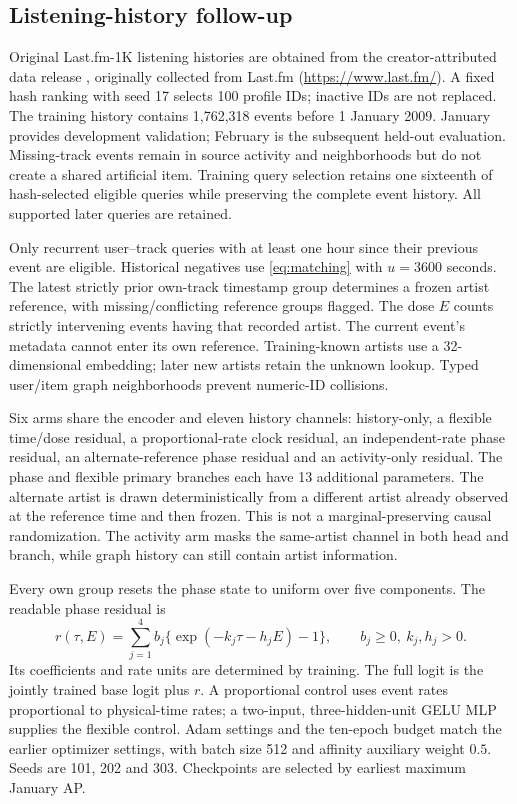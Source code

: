 \documentclass[pdflatex,sn-vancouver-num]{sn-jnl}
\theoremstyle{thmstyleone}
\begin{document}
\subsection{Listening-history follow-up}
Original Last.fm-1K listening histories are obtained from the creator-attributed data release \cite{lastfm,celma}, originally collected from Last.fm (\url{https://www.last.fm/}). A fixed hash ranking with seed 17 selects 100 profile IDs; inactive IDs are not replaced. The training history contains 1,762,318 events before 1 January 2009. January provides development validation; February is the subsequent held-out evaluation. Missing-track events remain in source activity and neighborhoods but do not create a shared artificial item. Training query selection retains one sixteenth of hash-selected eligible queries while preserving the complete event history. All supported later queries are retained.

Only recurrent user--track queries with at least one hour since their previous event are eligible. Historical negatives use \eqref{eq:matching} with $u=3600$ seconds. The latest strictly prior own-track timestamp group determines a frozen artist reference, with missing/conflicting reference groups flagged. The dose $E$ counts strictly intervening events having that recorded artist. The current event's metadata cannot enter its own reference. Training-known artists use a 32-dimensional embedding; later new artists retain the unknown lookup. Typed user/item graph neighborhoods prevent numeric-ID collisions.

Six arms share the encoder and eleven history channels: history-only, a flexible time/dose residual, a proportional-rate clock residual, an independent-rate phase residual, an alternate-reference phase residual and an activity-only residual. The phase and flexible primary branches each have 13 additional parameters. The alternate artist is drawn deterministically from a different artist already observed at the reference time and then frozen. This is not a marginal-preserving causal randomization. The activity arm masks the same-artist channel in both head and branch, while graph history can still contain artist information.

Every own group resets the phase state to uniform over five components. The readable phase residual is
\begin{equation}\label{eq:residual}
r(\tau,E)=\sum_{j=1}^4 b_j
\{\exp(-k_j\tau-h_jE)-1\},\qquad b_j\ge0,\ k_j,h_j>0.
\end{equation}
Its coefficients and rate units are determined by training. The full logit is the jointly trained base logit plus $r$. A proportional control uses event rates proportional to physical-time rates; a two-input, three-hidden-unit GELU MLP supplies the flexible control. Adam settings and the ten-epoch budget match the earlier optimizer settings, with batch size 512 and affinity auxiliary weight $0.5$. Seeds are 101, 202 and 303. Checkpoints are selected by earliest maximum January AP.
\end{document}
